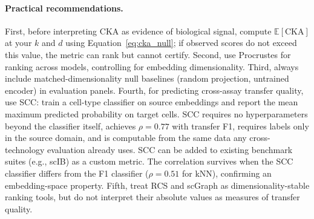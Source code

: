 \documentclass[11pt]{article}
\begin{document}
\paragraph{Practical recommendations.} First, before interpreting CKA as
evidence of biological signal, compute $\mathbb{E}[\mathrm{CKA}]$ at
your $k$ and $d$ using Equation~\ref{eq:cka_null}; if observed scores do
not exceed this value, the metric can rank but cannot certify. Second,
use Procrustes for ranking across models, controlling for
embedding dimensionality. Third, always include matched-dimensionality
null baselines (random projection, untrained encoder) in evaluation
panels. Fourth, for predicting cross-assay transfer quality, use SCC:
train a cell-type classifier on source embeddings and report the mean
maximum predicted probability on target cells. SCC requires no
hyperparameters beyond the classifier itself, achieves $\rho = 0.77$
with transfer F1, requires labels only in the source domain, and is
computable from the same data any cross-technology evaluation already
uses. SCC can be added to existing benchmark suites (e.g., scIB) as a
custom metric. The correlation survives
when the SCC classifier differs from the F1 classifier ($\rho = 0.51$
for kNN), confirming an embedding-space property. Fifth, treat RCS and scGraph
as dimensionality-stable ranking tools, but do not interpret their
absolute values as measures of transfer quality.
\end{document}
